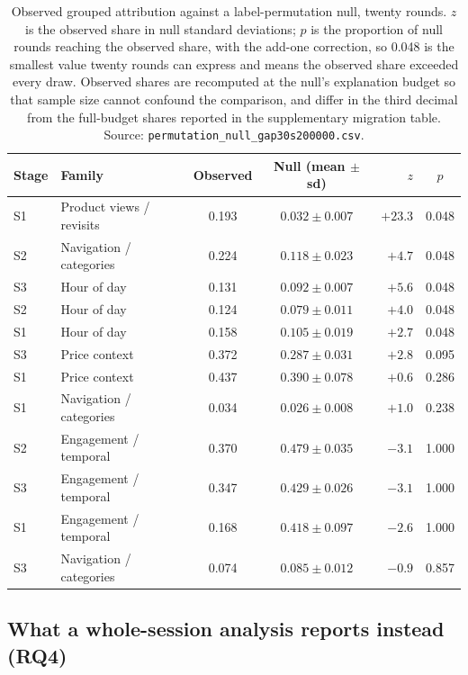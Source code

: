 \documentclass[a4paper]{article}
\begin{document}
\begin{table}[htbp]
\centering
\caption{Observed grouped attribution against a label-permutation null, twenty
rounds. $z$ is the observed share in null standard deviations; $p$ is the
proportion of null rounds reaching the observed share, with the add-one
correction, so 0.048 is the smallest value twenty rounds can express and means
the observed share exceeded every draw. Observed shares are recomputed at the
null's explanation budget so that sample size cannot confound the comparison,
and differ in the third decimal from the full-budget shares reported in the
supplementary migration table. Source:
\texttt{permutation\_null\_gap30s200000.csv}.}
\label{tab:permutation}
\small
\begin{tabular}{@{}llccrc@{}}
\toprule
\textbf{Stage} & \textbf{Family} & \textbf{Observed} & \textbf{Null (mean $\pm$ sd)}
& \textbf{$z$} & \textbf{$p$} \\
\midrule
S1 & Product views / revisits & 0.193 & $0.032 \pm 0.007$ & $+23.3$ & 0.048 \\
S2 & Navigation / categories  & 0.224 & $0.118 \pm 0.023$ & $+4.7$  & 0.048 \\
S3 & Hour of day              & 0.131 & $0.092 \pm 0.007$ & $+5.6$  & 0.048 \\
S2 & Hour of day              & 0.124 & $0.079 \pm 0.011$ & $+4.0$  & 0.048 \\
S1 & Hour of day              & 0.158 & $0.105 \pm 0.019$ & $+2.7$  & 0.048 \\
\midrule
S3 & Price context            & 0.372 & $0.287 \pm 0.031$ & $+2.8$  & 0.095 \\
S1 & Price context            & 0.437 & $0.390 \pm 0.078$ & $+0.6$  & 0.286 \\
S1 & Navigation / categories  & 0.034 & $0.026 \pm 0.008$ & $+1.0$  & 0.238 \\
\midrule
S2 & Engagement / temporal    & 0.370 & $0.479 \pm 0.035$ & $-3.1$  & 1.000 \\
S3 & Engagement / temporal    & 0.347 & $0.429 \pm 0.026$ & $-3.1$  & 1.000 \\
S1 & Engagement / temporal    & 0.168 & $0.418 \pm 0.097$ & $-2.6$  & 1.000 \\
S3 & Navigation / categories  & 0.074 & $0.085 \pm 0.012$ & $-0.9$  & 0.857 \\
\bottomrule
\end{tabular}
\end{table}

\subsection{What a whole-session analysis reports instead (RQ4)}
\label{sec:results-rq4}
\end{document}
